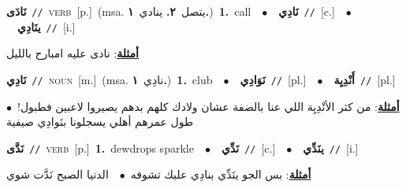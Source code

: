 \documentclass[10pt,a4paper,twoside]{article} %
\begin{document}
\begin{multicols}{2}
{\setlength\topsep{0pt}\textbf{\foreignlanguage{arabic}{نَادَى}}\ {\color{gray}\texttt{//}\color{black}}\ \textsc{verb}\ [p.]\ \color{gray}(msa. \foreignlanguage{arabic}{يتصل}~\foreignlanguage{arabic}{\textbf{٢.}}  \foreignlanguage{arabic}{ينادي}~\foreignlanguage{arabic}{\textbf{١.}})\color{black}\ \textbf{1.}~call\ \ $\bullet$\ \ \setlength\topsep{0pt}\textbf{\foreignlanguage{arabic}{نَادِي}}\ {\color{gray}\texttt{//}\color{black}}\ [c.]\ \ $\bullet$\ \ \setlength\topsep{0pt}\textbf{\foreignlanguage{arabic}{ينَادِي}}\ {\color{gray}\texttt{//}\color{black}}\ [i.]\  \begin{flushright}\color{gray}\foreignlanguage{arabic}{\textbf{\underline{\foreignlanguage{arabic}{أمثلة}}}: نادى عليه امبارح بالليل}\end{flushright}\color{black}} \vspace{2mm}

{\setlength\topsep{0pt}\textbf{\foreignlanguage{arabic}{نَادِي}}\ {\color{gray}\texttt{//}\color{black}}\ \textsc{noun}\ [m.]\ \color{gray}(msa. \foreignlanguage{arabic}{نادِي}~\foreignlanguage{arabic}{\textbf{١.}})\color{black}\ \textbf{1.}~club\ \ $\bullet$\ \ \setlength\topsep{0pt}\textbf{\foreignlanguage{arabic}{نَوَادِي}}\ {\color{gray}\texttt{//}\color{black}}\ [pl.]\ \ $\bullet$\ \ \setlength\topsep{0pt}\textbf{\foreignlanguage{arabic}{أَنْدِيِة}}\ {\color{gray}\texttt{//}\color{black}}\ [pl.]\  \begin{flushright}\color{gray}\foreignlanguage{arabic}{\textbf{\underline{\foreignlanguage{arabic}{أمثلة}}}: من كثر الأنْدِيِة اللي عنا بالضفة عشان ولادك كلهم بدهم يصيروا لاعبين فطبول!\ $\bullet$\ \  طول عمرهم أهلي يسجلونا بنَوادِي صيفية}\end{flushright}\color{black}} \vspace{2mm}

{\setlength\topsep{0pt}\textbf{\foreignlanguage{arabic}{نَدَّى}}\ {\color{gray}\texttt{//}\color{black}}\ \textsc{verb}\ [p.]\ \textbf{1.}~dewdrops sparkle\ \ $\bullet$\ \ \setlength\topsep{0pt}\textbf{\foreignlanguage{arabic}{نَدِّي}}\ {\color{gray}\texttt{//}\color{black}}\ [c.]\ \ $\bullet$\ \ \setlength\topsep{0pt}\textbf{\foreignlanguage{arabic}{ينَدِّي}}\ {\color{gray}\texttt{//}\color{black}}\ [i.]\  \begin{flushright}\color{gray}\foreignlanguage{arabic}{\textbf{\underline{\foreignlanguage{arabic}{أمثلة}}}: بس الجو ينَدِّي بنادِي عليك تشوفه\ $\bullet$\ \  الدنيا الصبح نَدَّت شوي}\end{flushright}\color{black}} \vspace{2mm}


\end{multicols}
\end{document}
